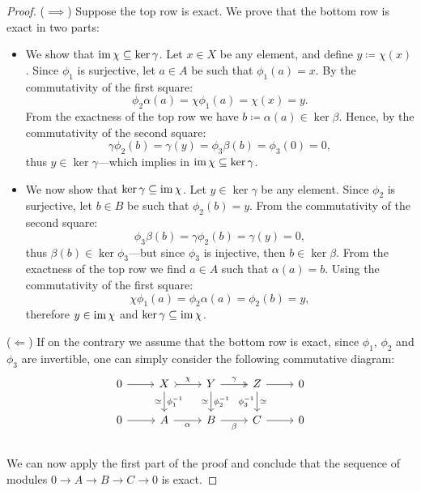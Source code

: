 \begin{proof}
(\(\implies\)) Suppose the top row is exact. We prove that the bottom row is
exact in two parts:
\begin{itemize}\setlength\itemsep{0em}
\item We show that \(\operatorname{im} \chi \subseteq \ker \gamma\). Let \(x \in X\) be any
  element, and define \(y \coloneq \chi(x)\). Since \(\phi_1\) is surjective,
  let \(a \in A\) be such that \(\phi_1(a) = x\). By the commutativity of the
  first square:
  \[
  \phi_2 \alpha(a) = \chi \phi_1(a) = \chi(x) = y.
  \]
  From the exactness of the top row we have \(b \coloneq \alpha(a) \in \ker
  \beta\). Hence, by the commutativity of the second square:
  \[
\gamma \phi_2(b) = \gamma(y) = \phi_3 \beta(b) = \phi_3(0) = 0,
  \]
  thus \(y \in \ker \gamma\)---which implies in \(\operatorname{im} \chi \subseteq \ker
  \gamma\).
\item We now show that \(\ker \gamma \subseteq \operatorname{im} \chi\). Let \(y \in \ker
  \gamma\) be any element. Since \(\phi_2\) is surjective, let \(b \in B\) be
  such that \(\phi_2(b) = y\). From the commutativity of the second square:
  \[
\phi_3 \beta(b) = \gamma \phi_2(b) = \gamma(y) = 0,
  \]
  thus \(\beta(b) \in \ker \phi_3\)---but since \(\phi_3\) is injective, then
  \(b \in \ker \beta\). From the exactness of the top row we find \(a \in A\)
  such that \(\alpha(a) = b\). Using the commutativity of the first square:
  \[
  \chi \phi_1(a) = \phi_2 \alpha(a) = \phi_2(b) = y,
  \]
  therefore \(y \in \operatorname{im} \chi\) and \(\ker \gamma \subseteq \operatorname{im} \chi\).
\end{itemize}

(\(\Leftarrow\)) If on the contrary we assume that the bottom row is exact,
since \(\phi_1\), \(\phi_2\) and \(\phi_3\) are invertible, one can simply
consider the following commutative diagram:
\[
\begin{tikzcd}
0 \ar[r]
&X \ar[r, tail, "\chi"] \ar[d, "\dis"', "\phi_1^{-1}"]
&Y \ar[r, two heads, "\gamma"]  \ar[d, "\dis"', "\phi_2^{-1}"]
&Z \ar[r]           \ar[d, "\dis", "\phi_3^{-1}"']
&0 \\
0 \ar[r]
&A \ar[r, "\alpha"']
&B \ar[r, "\beta"']
&C \ar[r]
&0 \\
\end{tikzcd}
\]
We can now apply the first part of the proof and conclude that the sequence of
modules \(0 \to A \to B \to C \to 0\) is exact.
\end{proof}

